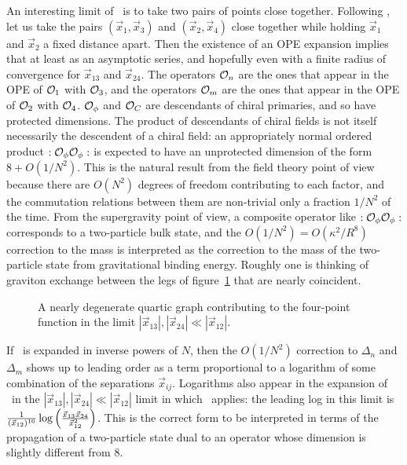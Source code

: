 An interesting limit of \FourPoint\ is to take two pairs of points close
together.  Following \cite{D'Hoker:1999pj}, let us take the pairs
$(\vec{x}_1,\vec{x}_3)$ and $(\vec{x}_2,\vec{x}_4)$ close together while
holding $\vec{x}_1$ and $\vec{x}_2$ a fixed distance apart.  Then the
existence of an OPE expansion implies that
 at least as an asymptotic series, and hopefully even with a finite radius
of convergence for $\vec{x}_{13}$ and $\vec{x}_{24}$.  The operators ${\cal
O}_n$ are the ones that appear in the OPE of ${\cal O}_1$ with ${\cal
O}_3$, and the operators ${\cal O}_m$ are the ones that appear in the OPE
of ${\cal O}_2$ with ${\cal O}_4$.  ${\cal O}_\phi$ and ${\cal O}_C$ are
descendants of chiral primaries, and so have protected dimensions.  The
product of descendants of chiral fields is not itself necessarily the descendent
of a chiral field: an appropriately normal ordered product $:{\cal O}_\phi {\cal
O}_\phi:$ is expected to have an unprotected dimension of the form $8 +
O(1/N^2)$.  This is the natural result from the field theory point of view
because there are $O(N^2)$ degrees of freedom contributing to each factor,
and the commutation relations between them are non-trivial only a fraction
$1/N^2$ of the time.  From the supergravity point of view, a composite
operator like $:{\cal O}_\phi {\cal O}_\phi:$ corresponds to a two-particle
bulk state, and the $O(1/N^2) = O(\kappa^2/R^8)$ correction to the mass is
interpreted as the correction to the mass of the two-particle state from
gravitational binding energy.  Roughly one is thinking of graviton exchange
between the legs of figure~\ref{degenerate} that are nearly coincident.
  \begin{figure}
   \vskip0cm
   \centerline{}
   \vskip0cm
 \caption{A nearly degenerate quartic graph contributing to the four-point
function in the limit $|\vec{x}_{13}|,|\vec{x}_{24}| \ll
|\vec{x}_{12}|$.}\label{degenerate}
  \end{figure}

If \DoubleOPE\ is expanded in inverse powers of $N$, then the $O(1/N^2)$
correction to $\Delta_n$ and $\Delta_m$ shows up to leading order as a term
proportional to a logarithm of some combination of the separations
$\vec{x}_{ij}$.  Logarithms also appear in the expansion of \FourPoint\ in
the $|\vec{x}_{13}|, |\vec{x}_{24}| \ll |\vec{x}_{12}|$ limit in which
\DoubleOPE\ applies: the leading log in this limit is ${1 \over
(\vec{x}_{12})^{16}} \log\left( {\vec{x}_{13} \vec{x}_{24} \over
\vec{x}_{12}^2} \right)$.  This is the correct form to be interpreted in
terms of the propagation of a two-particle state dual to an operator whose
dimension is slightly different from $8$.

